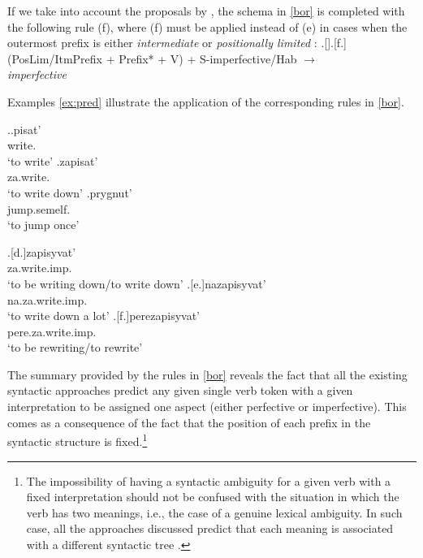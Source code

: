 If we take into account the proposals by \citet{Tatevosov:07, Tatevosov:09}, the schema in \ref{bor} is completed with the following rule (f), where (f) must be applied instead of (e) in cases when the outermost prefix is either \textit{intermediate} \citep{Tatevosov:07} or \textit{positionally limited} \citep{Tatevosov:09}: 
\ex.[]\a.[f.] (PosLim/ItmPrefix + Prefix* + V) + S-imperfective/Hab $\rightarrow$\\ \textit{imperfective} 

Examples \ref{ex:pred} illustrate the application of the corresponding rules in \ref{bor}.

\begin{minipage}{0.43\linewidth}
\vspace*{.5\baselineskip}
\ex.\label{ex:pred}\ag.\label{pred1}pisat'\textsuperscript{\IPF}\\
write.\\
`to write'
\bg.\label{pred2}zapisat'\textsuperscript{\PF}\\
za.write.\\
`to write down'
\bg.\label{pred3}prygnut'\textsuperscript{\PF}\\
jump.semelf.\\
`to jump once'

\vspace*{.5\baselineskip}
\end{minipage}%
\begin{minipage}{0.55\linewidth}
\vspace*{.5\baselineskip}
\exg.[d.]\label{pred4}zapisyvat'\textsuperscript{\IPF}\\
za.write.imp.\\
`to be writing down/to write down'
\bg.[e.]\label{pred5}nazapisyvat'\textsuperscript{\PF}\\
na.za.write.imp.\\
`to write down a lot'
\bg.[f.]\label{pred6}perezapisyvat'\textsuperscript{\IPF}\\
pere.za.write.imp.\\
`to be rewriting/to rewrite'

\vspace*{.5\baselineskip}
\end{minipage}

The summary provided by the rules in \ref{bor} reveals the fact that all the existing syntactic approaches predict any given single verb token with a given interpretation to be assigned one aspect (either perfective or imperfective). This comes as a consequence of the fact that the position of each prefix in the syntactic structure  is fixed.\footnote{The impossibility of having a syntactic ambiguity for a given verb with a fixed interpretation should not be confused with the situation in which the verb has two meanings, i.e., the case of a genuine lexical ambiguity. In such case, all the approaches discussed predict that each meaning is associated with a different syntactic tree .} 

